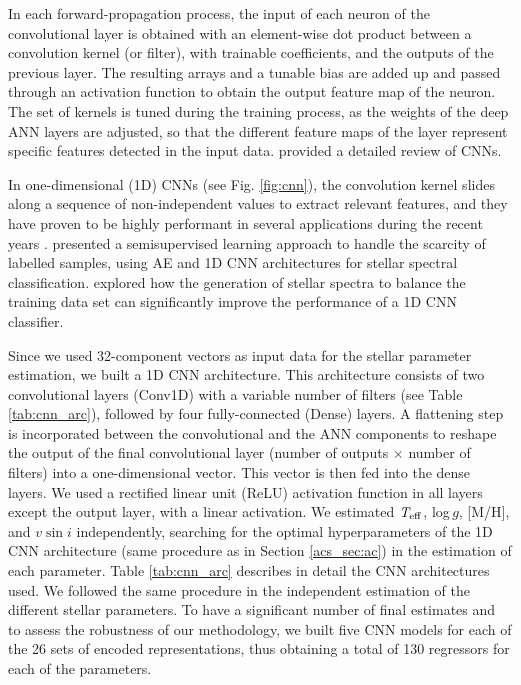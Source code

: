 In each forward-propagation process, the input of each neuron of the convolutional layer is obtained with an element-wise dot product between a convolution kernel (or filter), with trainable coefficients, and the outputs of the previous layer. The resulting arrays and a tunable bias are added up and passed through an activation function to obtain the output feature map of the neuron. The set of kernels is tuned during the training process, as the weights of the deep ANN layers are adjusted, so that the different feature maps of the layer represent specific features detected in the input data. \citet{surveycnn} provided a detailed review of CNNs.

In one-dimensional (1D) CNNs (see Fig. \ref{fig:cnn}), the convolution kernel slides along a sequence of non-independent values to extract relevant features, and they have proven to be highly performant in several applications during the recent years \citep{kiranyaz2019}. \citet{sharma2020} presented a semisupervised learning approach to handle the scarcity of labelled samples, using AE and 1D CNN architectures for stellar spectral classification. \citet{zheng2020} explored how the generation of stellar spectra to balance the training data set can significantly improve the performance of a 1D CNN classifier.


Since we used 32-component vectors as input data for the stellar parameter estimation, we built a 1D CNN architecture. This architecture consists of two convolutional layers (Conv1D) with a variable number of filters (see Table \ref{tab:cnn_arc}), followed by four fully-connected (Dense) layers. A flattening step is incorporated between the convolutional and the ANN components to reshape the output of the final convolutional layer (number of outputs $\times$ number of filters) into a one-dimensional vector. This vector is then fed into the dense layers. We used a rectified linear unit (ReLU) activation function in all layers except the output layer, with a linear activation. We estimated $\textit{T}_{\rm eff}$, log\,$\textit{g}$, [M/H], and $\textit{v}\sin{i}$ independently, searching for the optimal hyperparameters of the 1D CNN architecture (same procedure as in Section \ref{acs_sec:ac}) in the estimation of each parameter. Table \ref{tab:cnn_arc} describes in detail the CNN architectures used. We followed the same procedure in the independent estimation of the different stellar parameters. To have a significant number of final estimates and to assess the robustness of our methodology, we built five CNN models for each of the 26 sets of encoded representations, thus obtaining a total of 130 regressors for each of the parameters.

